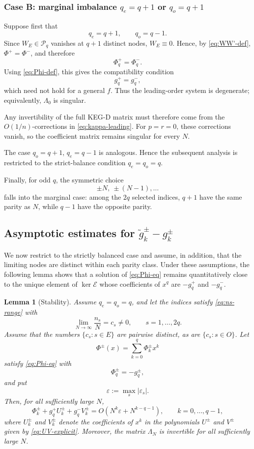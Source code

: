 \documentclass[11pt,a4paper]{article}
\newtheorem{lemma}[theorem]{Lemma}
\theoremstyle{definition}
\begin{document}
\subsubsection*{Case B: marginal imbalance \(q_e=q+1\) or \(q_o=q+1\)}

Suppose first that
\[
q_e=q+1,
\qquad
q_o=q-1.
\]
Since \(W_E\in\mathcal P_q\) vanishes at \(q+1\) distinct nodes,
\(W_E\equiv0\). Hence, by \eqref{eq:WW'-def},
\(\Phi^+=\Phi^-\), and therefore
\[
\Phi_q^+=\Phi_q^-.
\]
Using \eqref{eq:Phi-def}, this gives the compatibility condition
\[
g_q^+=g_q^-,
\]
which need not hold for a general \(f\). Thus the leading-order system
is degenerate; equivalently, \(\Lambda_0\) is singular.

Any invertibility of the full KEG-D matrix must therefore come from the
\(O(1/n)\)-corrections in \eqref{eq:kappa-leading}. For \(p=r=0\),
these corrections vanish, so the coefficient matrix remains singular
for every \(N\).

The case \(q_o=q+1\), \(q_e=q-1\) is analogous. Hence the subsequent
analysis is restricted to the strict-balance condition \(q_e=q_o=q\).

Finally, for odd \(q\), the symmetric choice
\[
\pm N,\ \pm(N-1),\dots
\]
falls into the marginal case: among the \(2q\) selected indices,
\(q+1\) have the same parity as \(N\), while \(q-1\) have the opposite
parity.

\subsection{Asymptotic estimates for $\widetilde g_k^\pm-g_k^\pm$}

We now restrict to the strictly balanced case and assume, in addition,
that the limiting nodes are distinct within each parity class. Under
these assumptions, the following lemma shows that a solution of
\eqref{eq:Phi-eq} remains quantitatively close to the unique element of
$\ker\mathcal E$ whose coefficients of $x^q$ are $-g_q^+$ and
$-g_q^-$.

\begin{lemma}[Stability]\label{lem:stab}
Assume $q_e=q_o=q$, and let the indices satisfy \eqref{eq:ns-range}
with
\[
\lim_{N\to\infty}\frac{n_s}{N}=c_s\neq0,
\qquad
s=1,\dots,2q.
\]
Assume that the numbers $\{c_s:s\in E\}$ are pairwise distinct, as are
$\{c_s:s\in O\}$. Let
\[
\Phi^\pm(x)=\sum_{k=0}^q\Phi_k^\pm x^k
\]
satisfy \eqref{eq:Phi-eq} with
\[
\Phi_q^\pm=-g_q^\pm,
\]
and put
\[
\varepsilon:=\max_s|\varepsilon_s|.
\]
Then, for all sufficiently large $N$,
\begin{equation}\label{eq:stab-bound}
\Phi_k^\pm+g_q^+U_k^\pm+g_q^-V_k^\pm
=
O\!\left(N^k\varepsilon+N^{k-q-1}\right),
\qquad
k=0,\dots,q-1,
\end{equation}
where $U_k^\pm$ and $V_k^\pm$ denote the coefficients of $x^k$ in
the polynomials $U^\pm$ and $V^\pm$ given by
\eqref{eq:UV-explicit}. Moreover, the matrix $\Lambda_N$ is
invertible for all sufficiently large $N$.
\end{lemma}
\end{document}
